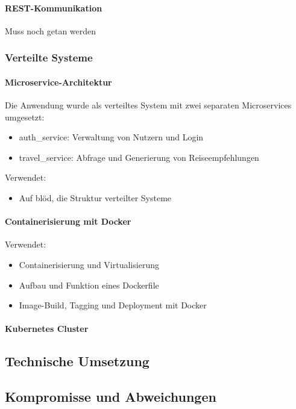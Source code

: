 \paragraph{REST-Kommunikation}  
Muss noch getan werden

\subsubsection{Verteilte Systeme}

\paragraph{Microservice-Architektur}  
Die Anwendung wurde als verteiltes System mit zwei separaten Microservices umgesetzt:
\begin{itemize}
  \item auth\_service: Verwaltung von Nutzern und Login
  \item travel\_service: Abfrage und Generierung von Reiseempfehlungen
\end{itemize}

Verwendet:
\begin{itemize}
  \item Auf blöd, die Struktur verteilter Systeme
\end{itemize}

\paragraph{Containerisierung mit Docker}  
Verwendet:
\begin{itemize}
  \item Containerisierung und Virtualisierung
  \item Aufbau und Funktion eines Dockerfile
  \item Image-Build, Tagging und Deployment mit Docker
\end{itemize}

\paragraph{Kubernetes Cluster}

\subsection{Technische Umsetzung}

\subsection{Kompromisse und Abweichungen}

